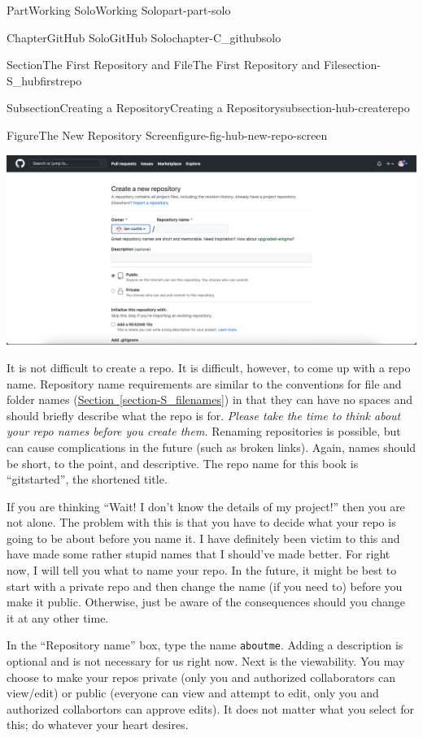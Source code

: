 \documentclass[oneside,10pt,]{book}
\newcommand{\xreffont}{\relax}
\newcommand{\mono}[1]{\texttt{#1}}
\begin{document}
\begin{partptx}{Part}{Working Solo}{}{Working Solo}{}{}{part-part-solo}
\begin{chapterptx}{Chapter}{GitHub Solo}{}{GitHub Solo}{}{}{chapter-C_githubsolo}
\begin{sectionptx}{Section}{The First Repository and File}{}{The First Repository and File}{}{}{section-S_hubfirstrepo}
\begin{subsectionptx}{Subsection}{Creating a Repository}{}{Creating a Repository}{}{}{subsection-hub-createrepo}
\begin{figureptx}{Figure}{The New Repository Screen}{figure-fig-hub-new-repo-screen}{}
\begin{image}{0.05}{0.9}{0.05}{}
\includegraphics[width=\linewidth]{external/hub_new_repo_screen.pdf}
\end{image}%
\tcblower
\end{figureptx}%
It is not difficult to create a repo. It is difficult, however, to come up with a repo name. Repository name requirements are similar to the conventions for file and folder names (\hyperref[section-S_filenames]{Section~{\xreffont\ref{section-S_filenames}}}) in that they can have no spaces and should briefly describe what the repo is for. \emph{Please take the time to think about your repo names before you create them.} Renaming repositories is possible, but can cause complications in the future (such as broken links). Again, names should be short, to the point, and descriptive. The repo name for this book is ``gitstarted'', the shortened title.%
\par
If you are thinking ``Wait! I don't know the details of my project!'' then you are not alone. The problem with this is that you have to decide what your repo is going to be about before you name it. I have definitely been victim to this and have made some rather stupid names that I should've made better. For right now, I will tell you what to name your repo. In the future, it might be best to start with a private repo and then change the name (if you need to) before you make it public. Otherwise, just be aware of the consequences should you change it at any other time.%
\par
In the ``Repository name'' box, type the name \mono{aboutme}. Adding a description is optional and is not necessary for us right now. Next is the viewability. You may choose to make your repos private (only you and authorized collaborators can view\slash{}edit) or public (everyone can view and attempt to edit, only you and authorized collabortors can approve edits). It does not matter what you select for this; do whatever your heart desires.%
\par

\end{subsectionptx}
\end{sectionptx}
\end{chapterptx}
\end{partptx}
\end{document}

